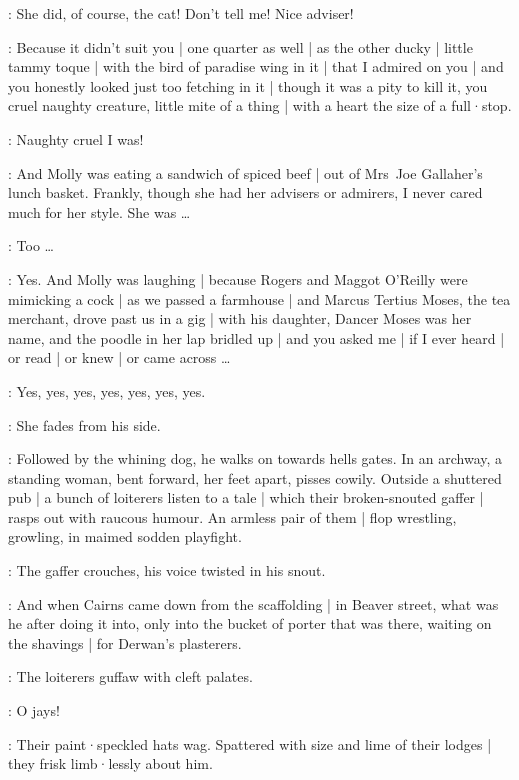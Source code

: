 \MrsBreen:
She did,
of course,
the cat!
Don't tell me!
Nice adviser!

\Bloom:
Because it didn't suit you |
one quarter as well |
as the other ducky |
little tammy toque |
with the bird of paradise wing in it |
that I admired on you |
and you honestly looked just too fetching in it |
though it was a pity to kill it,
you cruel naughty creature,
little mite of a thing |
with a heart the size of a full·stop.%

\MrsBreen:
Naughty cruel I was!

\Bloom:
And Molly was eating a sandwich of spiced beef |
out of Mrs~Joe Gallaher's lunch basket.
Frankly,
though she had her advisers or admirers,
I never cared much for her style.
She was \ldots

\MrsBreen:
Too \ldots

\Bloom:
Yes.
And Molly was laughing |
because Rogers and Maggot O'Reilly were mimicking a cock |
as we passed a farmhouse |
and Marcus Tertius Moses,
the tea merchant,
drove past us in a gig |
with his daughter,
Dancer Moses was her name,
and the poodle in her lap bridled up |
and you asked me |
if I ever heard |
or read |
or knew |
or came across \ldots

\MrsBreen:
Yes,
yes,
yes,
yes,
yes,
yes,
yes.

:
She fades from his side.

:
Followed by the whining dog,
he walks on towards hells gates.
In an archway,
a standing woman,
bent forward,
her feet apart,
pisses cowily.
Outside a shuttered pub |
a bunch of loiterers
listen to a tale |
which their broken-snouted gaffer |
rasps out with raucous humour.
An armless pair of them |
flop wrestling,
growling,
in maimed sodden playfight.

:
The gaffer crouches,
his voice twisted in his snout.

\Gaffer:
And when Cairns came down from the scaffolding |
in Beaver street,
what was he after doing it into,
only into the bucket of porter that was there,
waiting on the shavings |
for Derwan's plasterers.

:
The loiterers guffaw with cleft palates.

\Loiterers:
O jays!

:
Their paint·speckled hats wag.
Spattered with size and lime of their lodges |
they frisk limb·lessly about him.

